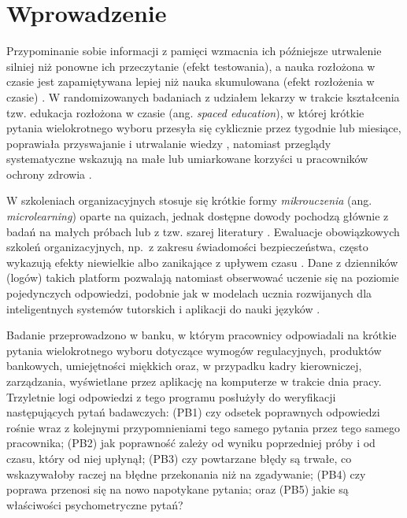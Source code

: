 \section{Wprowadzenie}

Przypominanie sobie informacji z pamięci wzmacnia ich późniejsze utrwalenie silniej niż ponowne
ich przeczytanie (efekt testowania), a nauka rozłożona w czasie jest zapamiętywana lepiej niż nauka
skumulowana (efekt rozłożenia w czasie) \citep{roediger2006,cepeda2006,cepeda2008}. W randomizowanych
badaniach z udziałem lekarzy w trakcie kształcenia tzw. edukacja rozłożona w czasie (ang.
\emph{spaced education}), w której krótkie pytania wielokrotnego wyboru przesyła się cyklicznie
przez tygodnie lub miesiące, poprawiała przyswajanie i utrwalanie wiedzy
\citep{kerfoot2007urology,kerfoot2007mededuc,kerfoot2009}, natomiast przeglądy systematyczne wskazują na małe
lub umiarkowane korzyści u pracowników ochrony zdrowia \citep{phillips2019,martinengo2024}.

W szkoleniach organizacyjnych stosuje się krótkie formy \emph{mikrouczenia} (ang.
\emph{microlearning}) oparte na quizach, jednak dostępne dowody pochodzą głównie z badań na małych
próbach lub z tzw. szarej literatury \citep{taylor2022}. Ewaluacje obowiązkowych szkoleń organizacyjnych, np.\
z zakresu świadomości bezpieczeństwa, często wykazują efekty niewielkie albo zanikające z upływem czasu
\citep{reinheimer2020,lain2022,ho2025}. Dane z dzienników (logów) takich platform pozwalają
natomiast obserwować uczenie się na poziomie pojedynczych odpowiedzi, podobnie jak w modelach ucznia
rozwijanych dla inteligentnych systemów tutorskich i aplikacji do nauki języków
\citep{corbett1994,pavlik2009,settles2016,tabibian2019,koedinger2023}.

Badanie przeprowadzono w banku, w którym pracownicy odpowiadali na krótkie pytania wielokrotnego
wyboru dotyczące wymogów regulacyjnych, produktów bankowych, umiejętności miękkich oraz, w przypadku
kadry kierowniczej, zarządzania, wyświetlane przez aplikację na komputerze w trakcie dnia pracy.
Trzyletnie logi odpowiedzi z tego programu posłużyły do weryfikacji następujących pytań
badawczych:
(PB1) czy odsetek poprawnych odpowiedzi rośnie wraz z kolejnymi przypomnieniami tego samego pytania
przez tego samego pracownika;
(PB2) jak poprawność zależy od wyniku poprzedniej próby i od czasu, który od niej upłynął;
(PB3) czy powtarzane błędy są trwałe, co wskazywałoby raczej na błędne przekonania niż na
zgadywanie;
(PB4) czy poprawa przenosi się na nowo napotykane pytania; oraz
(PB5) jakie są właściwości psychometryczne pytań?
